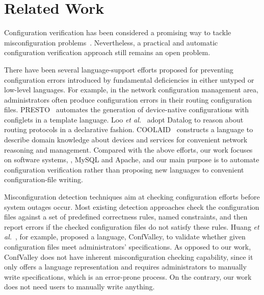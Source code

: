 
\section{Related Work}

Configuration verification has been considered a promising way  
to tackle misconfiguration problems~\cite{xu15systems}.
Nevertheless, a practical and automatic configuration
verification approach still remains an open problem.

There have been several language-support efforts proposed for preventing
configuration errors introduced by fundamental deficiencies in
either untyped or low-level languages. For example, in the network
configuration management area, administrators often
produce configuration errors in their routing configuration files.
PRESTO~\cite{enck07configuration} 
automates the generation of device-native configurations
with configlets in a template language. 
Loo {\em et al.}~\cite{loo05declarative} adopt Datalog to reason about 
routing protocols in a declarative fashion. 
COOLAID~\cite{chen10declarative} constructs
a language to describe domain knowledge about devices and
services for convenient network reasoning and management.
Compared with the above efforts, our work focuses on software systems, 
\eg, MySQL and Apache, and our main purpose is to automate configuration
verification rather than proposing new languages 
to convenient configuration-file writing. 

Misconfiguration detection techniques aim at checking configuration
efforts before system outages occur.
Most existing detection approaches check 
the configuration files against a set of predefined correctness 
rules, named constraints, and then report errors if 
the checked configuration files do not satisfy these rules.
Huang {\em et al.}~\cite{huang15confvalley},
for example, proposed a 
language, ConfValley, to validate 
whether given configuration files meet administrators' specifications. 
As opposed to our work, ConfValley does not
have inherent misconfiguration checking capability, since it only offers
a language representation and requires administrators to
manually write specifications, which is an error-prone
process. On the contrary, our work does not need users to manually
write anything.

